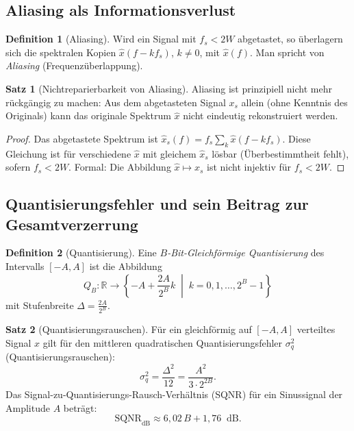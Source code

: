 ﻿\documentclass[a4paper,12pt]{article}
\theoremstyle{definition}
\newtheorem{definition}{Definition}
\newtheorem{satz}{Satz}
\begin{document}
\subsection{Aliasing als Informationsverlust}

\begin{definition}[Aliasing]
Wird ein Signal mit $f_s < 2W$ abgetastet, so überlagern sich die spektralen
Kopien $\hat{x}(f - kf_s)$, $k \neq 0$, mit $\hat{x}(f)$.
Man spricht von \emph{Aliasing} (Frequenzüberlappung).
\end{definition}

\begin{satz}[Nichtreparierbarkeit von Aliasing]
Aliasing ist prinzipiell nicht mehr rückgängig zu machen:
Aus dem abgetasteten Signal $x_s$ allein (ohne Kenntnis des Originals)
kann das originale Spektrum $\hat{x}$ nicht eindeutig rekonstruiert werden.
\end{satz}

\begin{proof}
Das abgetastete Spektrum ist $\hat{x}_s(f) = f_s \sum_{k} \hat{x}(f-kf_s)$.
Diese Gleichung ist für verschiedene $\hat{x}$ mit gleichem $\hat{x}_s$
lösbar (Überbestimmtheit fehlt), sofern $f_s < 2W$.  Formal: Die Abbildung
$\hat{x} \mapsto \hat{x}_s$ ist nicht injektiv für $f_s < 2W$.
\end{proof}

\subsection{Quantisierungsfehler und sein Beitrag zur Gesamtverzerrung}

\begin{definition}[Quantisierung]
Eine \emph{$B$-Bit-Gleichförmige Quantisierung} des Intervalls $[-A, A]$
ist die Abbildung
\[
Q_B: \mathbb{R} \to \left\{-A + \frac{2A}{2^B} k \;\middle|\; k = 0,1,\ldots,2^B-1\right\}
\]
mit Stufenbreite $\Delta = \frac{2A}{2^B}$.
\end{definition}

\begin{satz}[Quantisierungsrauschen]
\label{satz:quantisierung}
Für ein gleichförmig auf $[-A,A]$ verteiltes Signal $x$ gilt für den
mittleren quadratischen Quantisierungsfehler $\sigma_q^2$ (Quantisierungsrauschen):
\[
\sigma_q^2 = \frac{\Delta^2}{12} = \frac{A^2}{3 \cdot 2^{2B}}.
\]
Das Signal-zu-Quantisierungs-Rausch-Verhältnis (SQNR) für ein Sinussignal
der Amplitude $A$ beträgt:
\[
\mathrm{SQNR}_{\mathrm{dB}} \approx 6{,}02\,B + 1{,}76 \;\;\mathrm{dB}.
\]
\end{satz}
\end{document}
